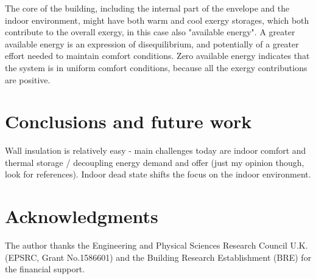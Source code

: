 \documentclass[10pt]{extarticle} %
\begin{document}
The core of the building, including the internal part of the envelope and the indoor environment, might have both warm and cool exergy storages, which both contribute to the overall exergy, in this case also "available energy". A greater available energy is an expression of disequilibrium, and potentially of a greater effort needed to maintain comfort conditions. Zero available energy indicates that the system is in uniform comfort conditions, because all the exergy contributions are positive.




\vfill \break

\section{Conclusions and future work}
Wall insulation is relatively easy - main challenges today are indoor comfort and thermal storage / decoupling energy demand and offer (just my opinion though, look for references). Indoor dead state shifts the focus on the indoor environment.

\section*{Acknowledgments}

The author thanks the Engineering and Physical Sciences Research Council U.K. (EPSRC, Grant No.1586601) and the Building Research Establishment (BRE) for the financial support.

{\small %
 
}

\vfill \break
\end{document}
